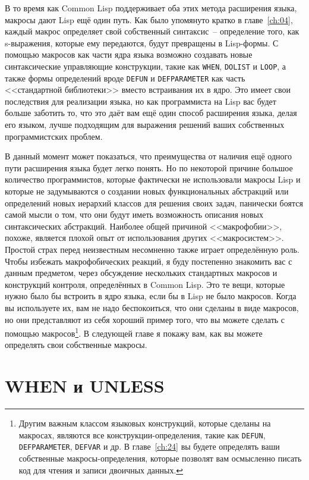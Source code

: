 В то время как Common Lisp поддерживает оба этих метода расширения языка, макросы дают
Lisp ещё один путь.  Как было упомянуто кратко в главе~\ref{ch:04}, каждый макрос определяет свой
собственный синтаксис~-- определение того, как s-выражения, которые ему передаются, будут
превращены в Lisp-формы. С помощью макросов как части ядра языка возможно создавать
новые синтаксические управляющие конструкции, такие как \lstinline{WHEN}, \lstinline{DOLIST} и
\lstinline{LOOP}, а также формы определений вроде \lstinline{DEFUN} и \lstinline{DEFPARAMETER} как
часть <<стандартной библиотеки>> вместо встраивания их в ядро. Это имеет свои последствия
для реализации языка, но как программиста на Lisp вас будет больше заботить то, что это
даёт вам ещё один способ расширения языка, делая его языком, лучше подходящим для
выражения решений ваших собственных программистских проблем.

В данный момент может показаться, что преимущества от наличия ещё одного пути расширения
языка будет легко понять. Но по некоторой причине большое количество программистов,
которые фактически не использовали макросы Lisp и которые не задумываются о создании новых
функциональных абстракций или определений новых иерархий классов для решения своих задач,
панически боятся самой мысли о том, что они будут иметь возможность описания новых
синтаксических абстракций. Наиболее общей причиной <<макрофобии>>, похоже, является плохой
опыт от использования других <<макросистем>>. Простой страх перед неизвестным несомненно
также играет определённую роль. Чтобы избежать макрофобических реакций, я буду постепенно
знакомить вас с данным предметом, через обсуждение нескольких стандартных макросов и
конструкций контроля, определённых в Common Lisp. Это те вещи, которые нужно было бы
встроить в ядро языка, если бы в Lisp не было макросов. Когда вы используете их, вам не
надо беспокоиться, что они сделаны в виде макросов, но они представляют из себя хороший
пример того, что вы можете сделать с помощью макросов\footnote{Другим важным классом
  языковых конструкций, которые сделаны на макросах, являются все конструкции-определения,
  такие как \lstinline{DEFUN}, \lstinline{DEFPARAMETER}, \lstinline{DEFVAR} и др. В
  главе~\ref{ch:24} вы будете определять ваши собственные макросы-определения, которые
  позволят вам осмысленно писать код для чтения и записи двоичных данных.}. В следующей
главе я покажу вам, как вы можете определять свои собственные макросы.

\section{WHEN и UNLESS}

